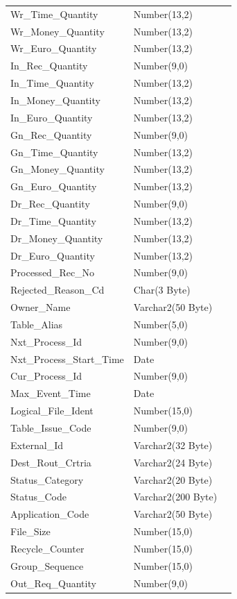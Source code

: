 \documentclass[12pt,twoside]{article}
\begin{document}
\begin{longtable}{l|l|l}
Wr\_Time\_Quantity & Number(13,2) & \\
Wr\_Money\_Quantity & Number(13,2) & \\
Wr\_Euro\_Quantity & Number(13,2) & \\
In\_Rec\_Quantity & Number(9,0) & \\
In\_Time\_Quantity & Number(13,2) & \\
In\_Money\_Quantity & Number(13,2) & \\
In\_Euro\_Quantity & Number(13,2) & \\
Gn\_Rec\_Quantity & Number(9,0) & \\
Gn\_Time\_Quantity & Number(13,2) & \\
Gn\_Money\_Quantity & Number(13,2) & \\
Gn\_Euro\_Quantity & Number(13,2) & \\
Dr\_Rec\_Quantity & Number(9,0) & \\
Dr\_Time\_Quantity & Number(13,2) & \\
Dr\_Money\_Quantity & Number(13,2) & \\
Dr\_Euro\_Quantity & Number(13,2) & \\
Processed\_Rec\_No & Number(9,0) & \\
Rejected\_Reason\_Cd & Char(3 Byte) & \\
Owner\_Name & Varchar2(50 Byte) & \\
Table\_Alias & Number(5,0) & \\
Nxt\_Process\_Id & Number(9,0) & \\
Nxt\_Process\_Start\_Time & Date & \\
Cur\_Process\_Id & Number(9,0) & \\
Max\_Event\_Time & Date & \\
Logical\_File\_Ident & Number(15,0) & \\
Table\_Issue\_Code & Number(9,0) & \\
External\_Id & Varchar2(32 Byte) & \\
Dest\_Rout\_Crtria & Varchar2(24 Byte) & \\
Status\_Category & Varchar2(20 Byte) & \\
Status\_Code & Varchar2(200 Byte) & \\
Application\_Code & Varchar2(50 Byte) & \\
File\_Size & Number(15,0) & \\
Recycle\_Counter & Number(15,0) & \\
Group\_Sequence & Number(15,0) & \\
Out\_Req\_Quantity & Number(9,0) & \\

\end{longtable}
\end{document}
